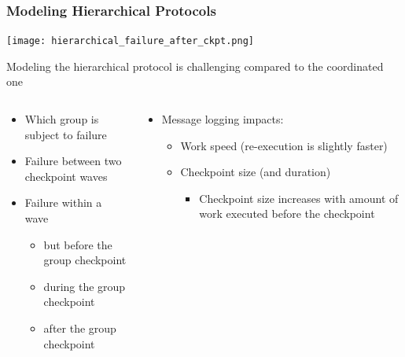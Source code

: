\begin{frame}
  \frametitle{Modeling Hierarchical Protocols}

  \begin{center}
    \texttt{[image: hierarchical\_failure\_after\_ckpt.png]}
  \end{center}

  Modeling the hierarchical protocol is challenging compared to the coordinated one
  
  \begin{columns}
    \begin{column}{.49\textwidth}
      \begin{itemize}
      \item Which group is subject to failure
      \item Failure between two checkpoint waves
      \item Failure within a wave
        \begin{itemize}
        \item but before the group checkpoint
        \item during the group checkpoint
        \item after the group checkpoint
        \end{itemize}
      \end{itemize}
    \end{column}\begin{column}{.49\textwidth}
      \begin{itemize}
      \item Message logging impacts:
        \begin{itemize}
        \item Work speed (re-execution is slightly faster)
        \item Checkpoint size (and duration)
          \begin{itemize}
          \item Checkpoint size increases with amount of work executed before the checkpoint
          \end{itemize}
        \end{itemize}
      \end{itemize}
    \end{column}
  \end{columns}
  
\end{frame}

